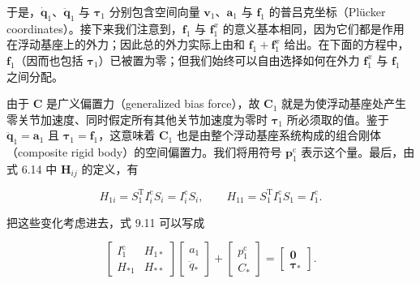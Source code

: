 \documentclass[10pt,a4paper]{book}
\theoremstyle{thmstyle} %
\theoremstyle{defstyle} %
\theoremstyle{prostyle} %
\begin{document}
于是，$\dot{\boldsymbol{q}}_{1}$、$\ddot{\boldsymbol{q}}_{1}$ 与 $\boldsymbol{\tau}_{1}$ 分别包含空间向量 $\boldsymbol{v}_{1}$、$\boldsymbol{a}_{1}$ 与 $\boldsymbol{f}_{1}$ 的普吕克坐标（Plücker coordinates）。接下来我们注意到，$\boldsymbol{f}_{1}$ 与 $\boldsymbol{f}_{1}^{x}$ 的意义基本相同，因为它们都是作用在浮动基座上的外力；因此总的外力实际上由和 $\boldsymbol{f}_{1}+\boldsymbol{f}_{1}^{x}$ 给出。在下面的方程中，$\boldsymbol{f}_{1}$（因而也包括 $\boldsymbol{\tau}_{1}$）已被置为零；但我们始终可以自由选择如何在外力 $\boldsymbol{f}_{1}^{x}$ 与 $\boldsymbol{f}_{1}$ 之间分配。



由于 $\boldsymbol{C}$ 是广义偏置力（generalized bias force），故 $\boldsymbol{C}_{1}$ 就是为使浮动基座处产生零关节加速度、同时假定所有其他关节加速度为零时 $\boldsymbol{\tau}_{1}$ 所必须取的值。鉴于 $\ddot{\boldsymbol{q}}_{1}=\boldsymbol{a}_{1}$ 且 $\boldsymbol{\tau}_{1}=\boldsymbol{f}_{1}$，这意味着 $\boldsymbol{C}_{1}$ 也是由整个浮动基座系统构成的组合刚体（composite rigid body）的空间偏置力。我们将用符号 $\boldsymbol{p}_{1}^{\mathrm{c}}$ 表示这个量。最后，由式 6.14 中 $\boldsymbol{H}_{ij}$ 的定义，有



$$
H _ { 1 i } = S _ { 1 } ^{\mathrm { T} } I _ { i } ^{\mathrm { c} } S _ { i } = I _ { i } ^{\mathrm { c} } S _ { i } , \qquad H _ { 11 } = S _ { 1 } ^{\mathrm { T} } I _ { 1 } ^{\mathrm { c} } S _ { 1 } = I _ { 1 } ^{\mathrm { c} } .
$$



把这些变化考虑进去，式 9.11 可以写成



$$
\left[ \begin{array}{ll} { I _ { 1 } ^{\mathrm { c} } } & { H _ { 1 * } } \\{ H _ { * 1 } } & { H _ { * * } } \end{array} \right] \left[ \begin{array}{l} { a _ { 1 } } \\{ \ddot { q } _ { * } } \end{array} \right] + \left[ \begin{array}{l} { p _ { 1 } ^{\mathrm { c} } } \\{ C _ { * } } \end{array} \right] = \left[ \begin{array}{l} { \mathbf { 0 } } \\{ \boldsymbol { \tau } _ { * } } \end{array} \right] .
$$
\end{document}
